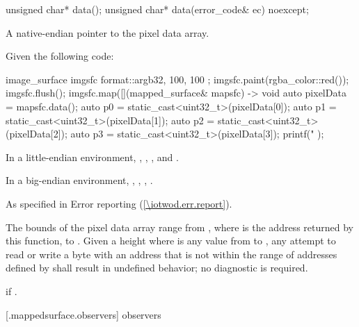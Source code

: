 \begin{itemdecl}
unsigned char* data();
unsigned char* data(error_code& ec) noexcept;
\end{itemdecl}
\begin{itemdescr}
\pnum
\returns
A native-endian pointer to the pixel data array.
\begin{example}
Given the following code:

\begin{codeblock}
image_surface imgsfc{ format::argb32, 100, 100 };
imgsfc.paint(rgba_color::red());
imgsfc.flush();
imgsfc.map([](mapped_surface& mapsfc) -> void {
    auto pixelData = mapsfc.data();
    auto p0 = static_cast<uint32_t>(pixelData[0]);
    auto p1 = static_cast<uint32_t>(pixelData[1]);
    auto p2 = static_cast<uint32_t>(pixelData[2]);
    auto p3 = static_cast<uint32_t>(pixelData[3]);
    printf("%
});
\end{codeblock}

In a little-endian environment, , , , and .

In a big-endian environment, , , , .
\end{example}

\pnum
\throws
As specified in Error reporting (\ref{\iotwod.err.report}).

\pnum
\remarks
The bounds of the pixel data array range from , where  is the address returned by this function, to . Given a height  where  is any value from  to , any attempt to read or write a byte with an address that is not within the range of addresses defined by  shall result in undefined behavior; no diagnostic is required.

\pnum
\errors
{} if .
\end{itemdescr}

 [\iotwod.mappedsurface.observers]{ observers}


